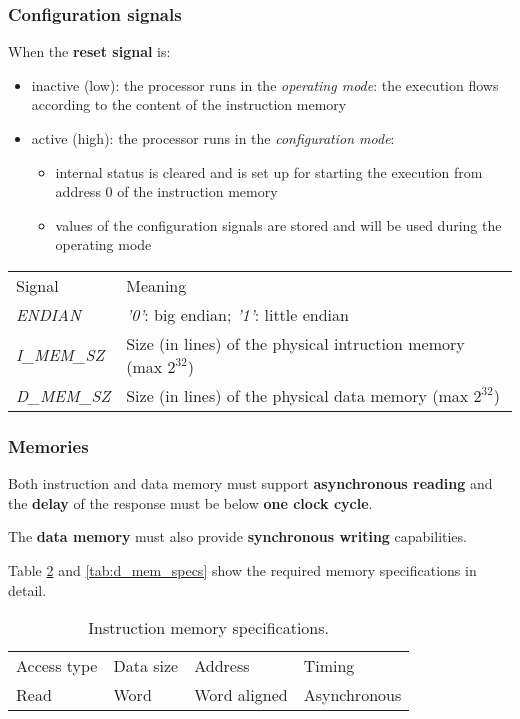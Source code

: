 \subsubsection{Configuration signals}
When the \textbf{reset signal} is:
\begin{itemize}
	\item inactive (low): the processor runs in the \textit{operating mode}:
		the execution flows according to the content of the instruction
		memory
	\item active (high): the processor runs in the \textit{configuration mode}:
		\begin{itemize}
			\item internal status is cleared and is set up for
				starting the execution from address 0 of the
				instruction memory
			\item values of the configuration signals are stored
				and will be used during the operating mode
		\end{itemize}
\end{itemize}

\begin{table}[H]
	\centering
	\begin{tabular}{ll}
		\hline
		\rowcolor{gray!50}
		Signal & Meaning \\
		\textit{ENDIAN} & \textit{'0'}: big endian; \textit{'1'}: little endian \\
		\rowcolor{gray!25}
		\textit{I\_MEM\_SZ} & Size (in lines) of the physical intruction
			memory (max $2^{32}$) \\
		\textit{D\_MEM\_SZ} & Size (in lines) of the physical data memory 
			(max $2^{32}$) \\
		\hline
	\end{tabular}
	\label{tab:config_signals}
\end{table}

\subsubsection{Memories}
Both instruction and data memory must support \textbf{asynchronous reading} and
the \textbf{delay} of the response must be below \textbf{one clock cycle}.

The \textbf{data memory} must also provide \textbf{synchronous writing} capabilities.

\bigskip
Table \ref{tab:i_mem_specs} and \ref{tab:d_mem_specs} show the required memory
specifications in detail.

\begin{table}[H]
	\centering
	\begin{tabular}{llll}
		\hline
		\rowcolor{gray!50}
		Access type & Data size & Address & Timing \\
		Read & Word & Word aligned & Asynchronous \\
		\hline
	\end{tabular}
	\caption{Instruction memory specifications.}
	\label{tab:i_mem_specs}
\end{table}

